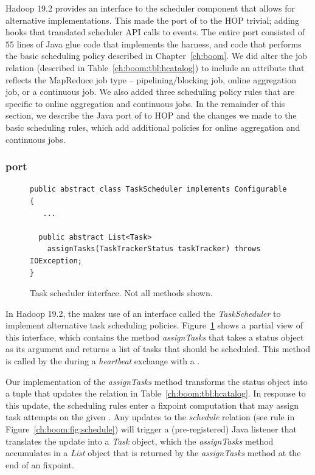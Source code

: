 Hadoop 19.2 provides an interface to the \JT scheduler component that allows
for alternative implementations.  This made the port of \JOL to the HOP \JT
trivial; adding hooks that translated scheduler API calls to \OVERLOG events.
The entire port consisted of $55$ lines of Java glue code that implements the
\JOL harness, and \OVERLOG code that performs the basic scheduling policy
described in Chapter~\ref{ch:boom}.  We did alter the job relation (described
in Table~\ref{ch:boom:tbl:hcatalog}) to include an attribute that reflects the
MapReduce job type -- pipelining/blocking job, online aggregation job, or a
continuous job.  We also added three scheduling policy rules that are specific
to online aggregation and continuous jobs.  In the remainder of this section,
we describe the Java port of \JOL to HOP and the changes we made to the basic
scheduling rules, which add additional policies for online aggregation and
continuous jobs.

\subsubsection{\JOL port}
\begin{figure}
\ssp
\begin{minipage}{\linewidth}
\centering
\begin{verbatim}
public abstract class TaskScheduler implements Configurable {
   ...
   
  public abstract List<Task> 
  	assignTasks(TaskTrackerStatus taskTracker) throws IOException;
}
\end{verbatim}
\end{minipage}
\caption{Task scheduler interface. Not all methods shown.}
\label{ch:hop:fig:taskscheduler}
\end{figure}


In Hadoop 19.2, the \JT makes use of an interface called the {\em
TaskScheduler} to implement alternative task scheduling policies.
Figure~\ref{ch:hop:fig:taskscheduler} shows a partial view of this interface,
which contains the method {\em assignTasks} that takes a \TT status object as
its argument and returns a list of tasks that should be scheduled.  This method
is called by the \JT during a {\em heartbeat} exchange with a \TT.

Our implementation of the {\em assignTasks} method transforms the \TT status
object into a tuple that updates the  relation in
Table~\ref{ch:boom:tbl:hcatalog}.  In response to this update, the scheduling
rules enter a fixpoint computation that may assign task attempts on the given
\TT.  Any updates to the {\em schedule} relation (see rule  in
Figure~\ref{ch:boom:fig:schedule}) will trigger a (pre-registered) Java
listener that translates the update into a {\em Task} object, which the {\em
assignTasks} method accumulates in a {\em List} object that is returned by
the {\em assignTasks} method at the end of an \OVERLOG fixpoint.

